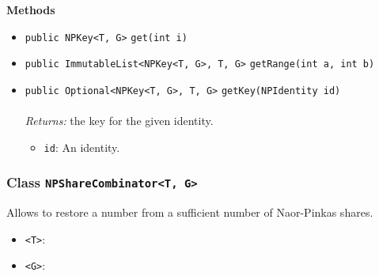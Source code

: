 \textbf{\sffamily Methods}
\begin{itemize}
\item \lstinline|public NPKey<T, G>| \lstinline|get|\lstinline|(int i)| \\[-0.6em]




\item \lstinline|public ImmutableList<NPKey<T, G>, T, G>| \lstinline|getRange|\lstinline|(int a, int b)| \\[-0.6em]




\item \lstinline|public Optional<NPKey<T, G>, T, G>| \lstinline|getKey|\lstinline|(NPIdentity id)|\\ \\[-0.6em]
\emph{Returns:} the key for the given identity.
\begin{itemize}
\item \lstinline|id|: An identity.
\end{itemize}



\end{itemize}

\subsubsection{Class \lstinline|NPShareCombinator<T, G>|}
Allows to restore a number from a sufficient number of Naor-Pinkas shares. \\
\noindent\begin{minipage}[t]{5cm}
\vspace{0.3em}
\hspace*{2em}
\vspace{0.3em}
\end{minipage}

\begin{itemize}
\item \lstinline|<T>|: 
\item \lstinline|<G>|: 
\end{itemize}



